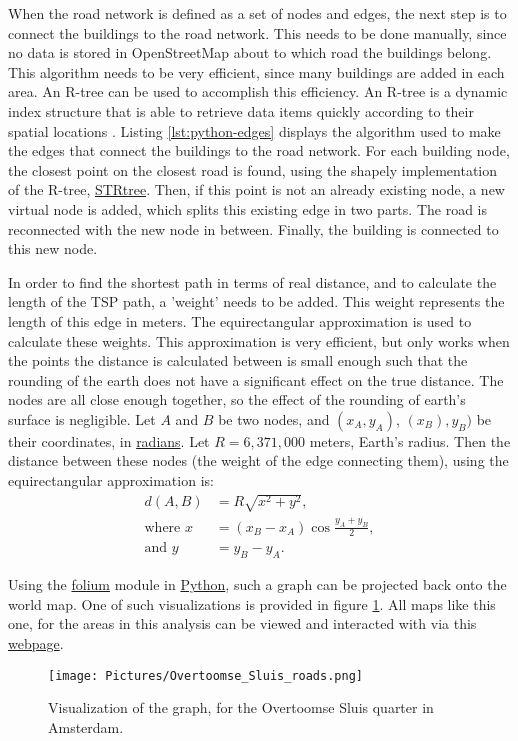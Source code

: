 When the road network is defined as a set of nodes and edges, the next step is to connect the buildings
to the road network. This needs to be done manually, since no data is stored in OpenStreetMap
about to which road the buildings belong. This algorithm needs to be very efficient, since many
buildings are added in each area. An R-tree can be used to accomplish this efficiency.
An R-tree is a dynamic index structure that is able to retrieve data items quickly according to
their spatial locations \citep{guttman1984r}. Listing \ref{lst:python-edges} displays the algorithm
used to make the edges that connect the buildings to the road network. For each building node,
the closest point on the closest road is found, using the shapely implementation of the R-tree,
\url{STRtree}. Then, if this point is not an already existing node, a new virtual node is added,
which splits this existing edge in two parts. The road is reconnected with the new node in between.
Finally, the building is connected to this new node.

In order to find the shortest path in terms of real distance, and to calculate the length of the
TSP path, a 'weight' needs to be added. This weight represents the length of this edge in meters.
The equirectangular approximation is used to calculate these weights. This approximation is very
efficient, but only works when the points the distance is calculated between is small enough such
that the rounding of the earth does not have a significant effect on the true distance.
The nodes are all close enough together, so the effect of the
rounding of earth's surface is negligible. Let $A$ and $B$ be two nodes,
and $(x_A,y_A)$, $(x_B),y_B)$ be their coordinates, in \url{radians}. Let $R=6,371,000$ meters,
Earth's radius. Then the distance between these nodes (the weight of the edge connecting them),
using the equirectangular approximation is:
\begin{align}
	\label{eq:equirectangluar_approx}
	d(A,B)         & =R\sqrt{x^2+y^2},                  \\
	\text{where }x & =(x_B-x_A)\cos{\frac{y_A+y_B}{2}}, \\
	\text{and }y   & =y_B-y_A.
\end{align}

Using the \url{folium} module in \url{Python}, such a graph can be projected back onto the world map.
One of such visualizations is provided in figure \ref{fig:overtoomse_sluis}. All maps like this one,
for the areas in this analysis can be viewed and interacted with via this
\href{https://koenstevens.nl/wp-content/uploads/maps/}{\url{webpage}}.
\begin{figure}[H]
	\caption{Visualization of the graph, for the Overtoomse Sluis quarter in Amsterdam.}
	\label{fig:overtoomse_sluis}
	\texttt{[image: Pictures/Overtoomse\_Sluis\_roads.png]}
\end{figure}

